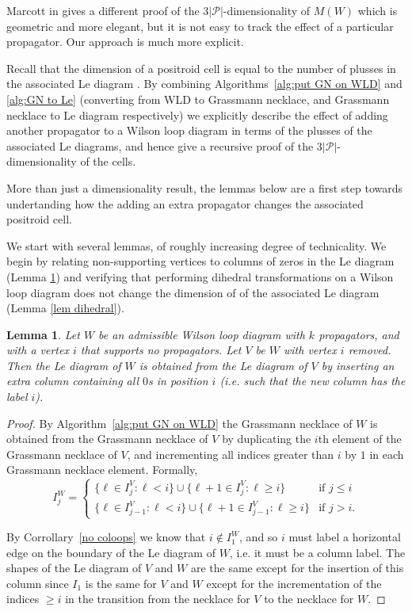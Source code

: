 \documentclass[11pt]{article}
\newcommand{\cP}{\mathcal{P}}
\newtheorem{lem}[thm]{Lemma}
\theoremstyle{remark}
\theoremstyle{definition}
\begin{document}
Marcott in \cite{WLDdim} gives a different proof of the $3|\cP|$-dimensionality of $M(W)$ which is geometric and more elegant, but it is not easy to track the effect of a particular propagator.  Our approach is much more explicit.

Recall that the dimension of a positroid cell is equal to the number of plusses in the associated Le diagram \cite[Theorem 6.5]{Postnikov}. By combining Algorithms~\ref{alg:put GN on WLD} and \ref{alg:GN to Le} (converting from WLD to Grassmann necklace, and Grassmann necklace to Le diagram respectively) we explicitly describe the effect of adding another propagator to a Wilson loop diagram in terms of the plusses of the associated Le diagrams, and hence give a recursive proof of the $3|\cP|$-dimensionality of the cells.

More than just a dimensionality result, the lemmas below are a first step towards undertanding how the adding an extra propagator changes the associated positroid cell. 

We start with several lemmas, of roughly increasing degree of technicality. We begin by relating non-supporting vertices to columns of zeros in the Le diagram (Lemma \ref{lem uncovered}) and verifying that performing dihedral transformations on a Wilson loop diagram does not change the dimension of of the associated Le diagram (Lemma \ref{lem dihedral}).

\begin{lem}\label{lem uncovered}
Let $W$ be an admissible Wilson loop diagram with $k$ propagators, and with a vertex $i$ that supports no propagators.  Let $V$ be $W$ with vertex $i$ removed.  Then the Le diagram of $W$ is obtained from the Le diagram of $V$ by inserting an extra column containing all $0$s in position $i$ (i.e. such that the new column has the label $i$).
\end{lem} 

\begin{proof}
  By Algorithm~\ref{alg:put GN on WLD} the Grassmann necklace of $W$ is obtained from the Grassmann necklace of $V$ by duplicating the $i$th element of the Grassmann necklace of $V$, and incrementing all indices greater than $i$ by $1$ in each Grassmann necklace element.  Formally, 
  \[
  I_j^{W} =
  \begin{cases}
    \{\ell \in I_j^{V} : \ell < i\} \cup \{\ell+1 \in I_j^{V} : \ell \geq i\} & \text{if $j\leq i$} \\
    \{\ell \in I_{j-1}^{V} : \ell < i\} \cup \{\ell+1 \in I_{j-1}^{V} : \ell \geq i\} & \text{if $j > i$.}
  \end{cases}
  \]


By Corrollary~\ref{no coloops} we know that $i \not\in I_1^W$, and so $i$ must label a horizontal edge on the boundary of the Le diagram of $W$, i.e. it must be a column label. The shapes of the Le diagram of $V$ and $W$ are the same except for the insertion of this column since $I_1$ is the same for $V$ and $W$ except for the incrementation of the indices $\geq i$ in the transition from the necklace for $V$ to the necklace for $W$. 
\end{proof}
\end{document}
